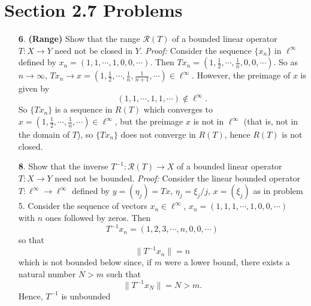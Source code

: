 \documentclass{article}
\begin{document}
\section*{Section 2.7 Problems}
\begin{itemize}
    \item[\textbf{6}.] \textbf{(Range)} Show that the range $\mathcal{R}(T)$ of a bounded linear operator $T: X \to Y$ need not be closed in $Y$.
    \newline\newline
    \textit{Proof:} Consider the sequence $\{x_n\}$ in $\ell^{\infty}$ defined by $x_n = (1, 1, \cdots, 1, 0, 0, \cdots)$. Then $Tx_n = (1, \tfrac{1}{2}, \cdots, \tfrac{1}{n}, 0, 0, \cdots)$. So as $n \to \infty$, $Tx_n \to x = (1, \tfrac{1}{2}, \cdots, \tfrac{1}{n}, \tfrac{1}{n+1},\cdots) \in \ell^{\infty}$. However, the preimage of $x$ is given by
    \[(1, 1, \cdots, 1, 1,\cdots) \notin \ell^{\infty}.\]
    So $\{Tx_n\}$ is a sequence in $R(T)$ which converges to $x = (1, \tfrac{1}{2}, \cdots, \tfrac{1}{n}, \cdots) \in \ell^{\infty}$, but the preimage $x$ is not in $\ell^{\infty}$ (that is, not in the domain of $T$), so $\{Tx_n\}$ does not converge in $R(T)$, hence $R(T)$ is not closed. 
    


    \item[\textbf{8}.] Show that the inverse $T^{-1}: \mathcal{R}(T) \to X$ of a bounded linear operator $T: X \to Y$ need not be bounded.
    \newline\newline
    \textit{Proof:} Consider the linear bounded operator $T: \ell^{\infty} \to \ell^{\infty}$ defined by $y = (\eta_j) = Tx$, $\eta_j = \xi_j/j$, $x = (\xi_j)$ as in problem 5. Consider the sequence of vectors $x_n \in \ell^{\infty}$, $x_n = (1,1,1, \cdots, 1, 0, 0, \cdots)$ with $n$ ones followed by zeros. Then
    \[T^{-1}x_n = (1, 2, 3, \cdots, n, 0, 0, \cdots)\]
    so that 
    \[\|T^{-1}x_n\| = n\]
    which is not bounded below since, if $m$ were a lower bound, there exists a natural number $N > m$ such that 
    \[\|T^{-1}x_N\| = N > m.\]
    Hence, $T^{-1}$ is unbounded
\end{itemize}
\end{document}
